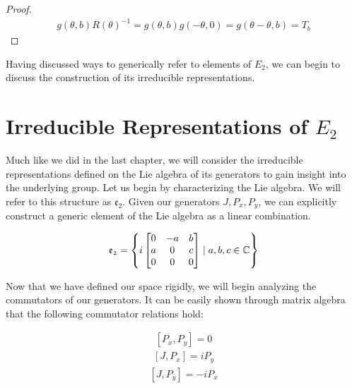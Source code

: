 \noindent\begin{proof} \cite{Tung}
\begin{equation}
\begin{aligned}
g(\theta,b)R(\theta)^{-1} = g(\theta,b)g(-\theta,0) = g(\theta-\theta,b) = T_b 
\end{aligned}
\end{equation}
\end{proof}

Having discussed ways to generically refer to elements of $E_2$, we can begin to discuss the construction of its irreducible representations.

\section{Irreducible Representations of $E_2$}

Much like we did in the last chapter, we will consider the irreducible representations defined on the Lie algebra of its generators to gain insight into the underlying group. Let us begin by characterizing the Lie algebra. We will refer to this structure as $\mathfrak{e_2}$. Given our generators $J, P_x,P_y$, we can explicitly construct a generic element of the Lie algebra as a linear combination.

$$\mathfrak{e_2} = \left\{i\begin{bmatrix}
								0 & -a & b \\
								a & 0 & c \\
								0 & 0 & 0
							 \end{bmatrix} \mid a,b,c \in \mathbb{C}\right\}$$

Now that we have defined our space rigidly, we will begin analyzing the commutators of our generators. It can be easily shown through matrix algebra that the following commutator relations hold:

\begin{equation}
\begin{aligned}
	[P_x,P_y] = 0
\end{aligned}
\end{equation}
\begin{equation}
\begin{aligned}
	[J,P_x] = iP_y
\end{aligned}
\end{equation}
\begin{equation}
\begin{aligned}
	[J,P_y] = -iP_x
\end{aligned}
\end{equation}

